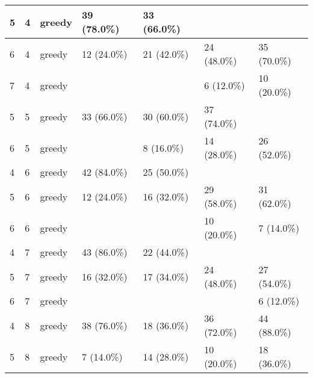 \documentclass[oneside,canadian,landscape]{article}
\begin{document}
\begin{center}
\begin{longtable}{|l|l|l||l|l|l|l|}
5&4&greedy&39 (78.0\%)&33 (66.0\%)&&\\ \hline
6&4&greedy&12 (24.0\%)&21 (42.0\%)&24 (48.0\%)&35 (70.0\%)\\ \hline
7&4&greedy&&&6 (12.0\%)&10 (20.0\%)\\ \hline
5&5&greedy&33 (66.0\%)&30 (60.0\%)&37 (74.0\%)&\\ \hline
6&5&greedy&&8 (16.0\%)&14 (28.0\%)&26 (52.0\%)\\ \hline
4&6&greedy&42 (84.0\%)&25 (50.0\%)&&\\ \hline
5&6&greedy&12 (24.0\%)&16 (32.0\%)&29 (58.0\%)&31 (62.0\%)\\ \hline
6&6&greedy&&&10 (20.0\%)&7 (14.0\%)\\ \hline
4&7&greedy&43 (86.0\%)&22 (44.0\%)&&\\ \hline
5&7&greedy&16 (32.0\%)&17 (34.0\%)&24 (48.0\%)&27 (54.0\%)\\ \hline
6&7&greedy&&&&6 (12.0\%)\\ \hline
4&8&greedy&38 (76.0\%)&18 (36.0\%)&36 (72.0\%)&44 (88.0\%)\\ \hline
5&8&greedy&7 (14.0\%)&14 (28.0\%)&10 (20.0\%)&18 (36.0\%)\\ \hline
\end{longtable}
\end{center}
\end{document}
